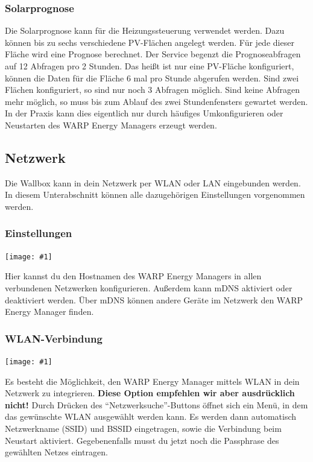 \documentclass[a4paper,10pt]{article}
\newcommand{\gfx}[1]{\texttt{[image: \#1]}}
\begin{document}
\begin{multicols*}{2}
       
    
    \subsubsection{Solarprognose}
    Die Solarprognose kann für die Heizungssteuerung verwendet werden. Dazu können bis zu sechs verschiedene PV-Flächen angelegt werden. Für jede dieser Fläche wird eine Prognose berechnet.
    Der Service begenzt die Prognoseabfragen auf 12 Abfragen pro 2 Stunden. Das heißt ist nur eine PV-Fläche konfiguriert, können die Daten für die Fläche 6 mal pro Stunde abgerufen werden.
    Sind zwei Flächen konfiguriert, so sind nur noch 3 Abfragen möglich. Sind keine Abfragen mehr möglich, so muss bis zum Ablauf des zwei Stundenfensters gewartet werden. In der Praxis kann dies eigentlich nur 
    durch häufiges Umkonfigurieren oder Neustarten des WARP Energy Managers erzeugt werden.


	\subsection{Netzwerk}
	\label{network}
	Die Wallbox kann in dein Netzwerk per WLAN oder LAN eingebunden werden.
	In diesem Unterabschnitt können alle dazugehörigen Einstellungen vorgenommen werden.

	\subsubsection{Einstellungen}

	\gfx{./img/resized/web_network}

	Hier kannst du den Hostnamen des WARP Energy Managers in allen verbundenen Netzwerken konfigurieren. Außerdem kann mDNS aktiviert oder deaktiviert werden.
	Über mDNS können andere Geräte im Netzwerk den WARP Energy Manager finden.


	\subsubsection{WLAN-Verbindung}
	\gfx{./img/resized/web_wifi_sta}

	Es besteht die Möglichkeit, den WARP Energy Manager mittels WLAN in dein Netzwerk
	zu integrieren. \textbf{Diese Option empfehlen wir aber ausdrücklich
	nicht!}
	Durch Drücken des \enquote{Netzwerksuche}-Buttons öffnet sich ein Menü, in dem das gewünschte WLAN ausgewählt werden kann.
	Es werden dann automatisch Netzwerkname (SSID) und BSSID eingetragen, sowie die Verbindung beim Neustart aktiviert.
	Gegebenenfalls musst du jetzt noch die Passphrase des gewählten Netzes eintragen.


\end{multicols*}
\end{document}
